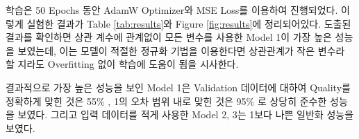 \documentclass[letterpaper,10pt]{article}
\begin{document}
	학습은 50 Epochs 동안 AdamW Optimizer와 MSE Loss를 이용하여 진행되었다. 이렇게 실험한 결과가 Table \ref{tab:results}와 Figure \ref{fig:results}에 정리되어있다. 도출된 결과를 확인하면 상관 계수에 관계없이 모든 변수를 사용한 Model 1이 가장 높은 성능을 보였는데, 이는 모델이 적절한 정규화 기법을 이용한다면 상관관계가 작은 변수라 할 지라도 Overfitting 없이 학습에 도움이 됨을 시사한다.
	
	결과적으로 가장 높은 성능을 보인 Model 1은 Validation 데이터에 대하여 Quality를 정확하게 맞힌 것은 55\% , 1의 오차 범위 내로 맞힌 것은 95\% 로 상당히 준수한 성능을 보였다. 그리고 입력 데이터를 적게 사용한 Model 2, 3는 1보다 나쁜 일반화 성능을 보였다.
	
	
	
\end{document}
